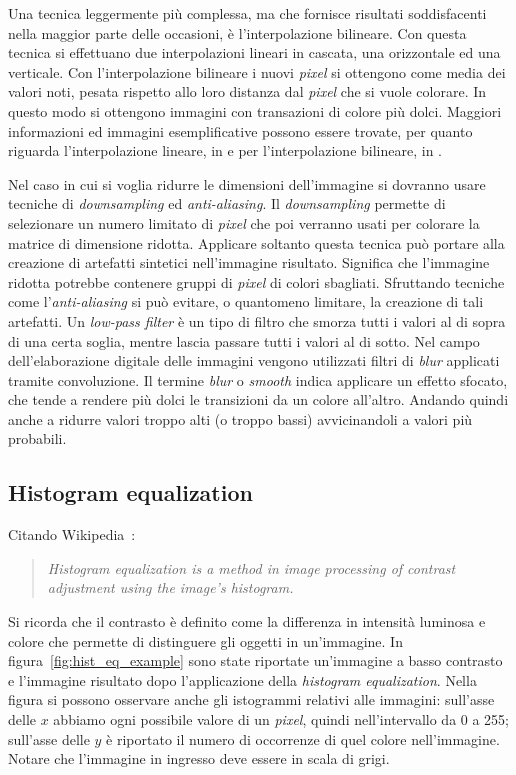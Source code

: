Una tecnica leggermente più complessa, ma che fornisce risultati soddisfacenti nella maggior parte delle occasioni, è l'interpolazione bilineare.
Con questa tecnica si effettuano due interpolazioni lineari in cascata, una orizzontale ed una verticale.
Con l'interpolazione bilineare i nuovi \textit{pixel} si ottengono come media dei valori noti, pesata rispetto allo loro distanza dal \textit{pixel} che si vuole colorare.
In questo modo si ottengono immagini con transazioni di colore più dolci.
Maggiori informazioni ed immagini esemplificative possono essere trovate, per quanto riguarda l'interpolazione lineare, in \cite{linear-interpolation} e per l'interpolazione bilineare, in \cite{bilinear-interpolation}.

Nel caso in cui si voglia ridurre le dimensioni dell'immagine si dovranno usare tecniche di \textit{downsampling} ed \textit{anti-aliasing}.
Il \textit{downsampling} permette di selezionare un numero limitato di \textit{pixel} che poi verranno usati per colorare la matrice di dimensione ridotta.
Applicare soltanto questa tecnica può portare alla creazione di artefatti sintetici nell'immagine risultato.
Significa che l'immagine ridotta potrebbe contenere gruppi di \textit{pixel} di colori sbagliati.
Sfruttando tecniche come l'\textit{anti-aliasing} si può evitare, o quantomeno limitare, la creazione di tali artefatti.
Un \textit{low-pass filter} è un tipo di filtro che smorza tutti i valori al di sopra di una certa soglia, mentre lascia passare tutti i valori al di sotto.
Nel campo dell'elaborazione digitale delle immagini vengono utilizzati filtri di \textit{blur} applicati tramite convoluzione.
Il termine \textit{blur} o \textit{smooth} indica applicare un effetto sfocato, che tende a rendere più dolci le transizioni da un colore all'altro.
Andando quindi anche a ridurre valori troppo alti (o troppo bassi) avvicinandoli a valori più probabili.


\clearpage
\subsection {Histogram equalization}
Citando Wikipedia~\cite{wikipedia-hist-eq}:
\begin{quote}
  \textit{Histogram equalization is a method in image processing of contrast adjustment using the image's histogram.}
\end{quote}
Si ricorda che il contrasto è definito come la differenza in intensità luminosa e colore che permette di distinguere gli oggetti in un'immagine.
In figura~\ref{fig:hist_eq_example} sono state riportate un'immagine a basso contrasto e l'immagine risultato dopo l'applicazione della \textit{histogram equalization}.
Nella figura si possono osservare anche gli istogrammi relativi alle immagini: sull'asse delle $x$ abbiamo ogni possibile valore di un \textit{pixel}, quindi nell'intervallo da 0 a 255; sull'asse delle $y$ è riportato il numero di occorrenze di quel colore nell'immagine.
Notare che l'immagine in ingresso deve essere in scala di grigi.

